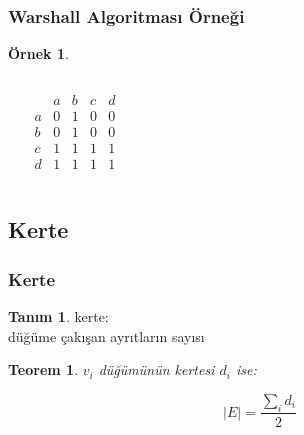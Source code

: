 \documentclass[dvipsnames]{beamer}
\theoremstyle{definition}
\newtheorem{tanim}[theorem]{Tanım}
\theoremstyle{example}
\newtheorem{ornek}[theorem]{Örnek}
\theoremstyle{plain}
\newtheorem{teorem}[theorem]{Teorem}
\begin{document}
\begin{frame}
  \frametitle{Warshall Algoritması Örneği}

  \begin{ornek}
    \begin{columns}
      \begin{center}
      \end{center}

      \[
        \begin{array}{c|cccc}
              & a & b & c & d\\\hline
            a & 0 & 1 & 0 & 0\\
            b & 0 & 1 & 0 & 0\\
            c & 1 & 1 & 1 & 1\\
            d & 1 & 1 & 1 & 1
        \end{array}
      \]
    \end{columns}
  \end{ornek}
\end{frame}

\subsection{Kerte}

\begin{frame}
  \frametitle{Kerte}

  \begin{tanim}
    \alert{kerte}:\\
    düğüme çakışan ayrıtların sayısı
  \end{tanim}

  \pause
  \begin{teorem}
    $v_i$ düğümünün kertesi $d_i$ ise:

    \[|E| = \frac{\sum_i d_i}{2}\]
  \end{teorem}
\end{frame}
\end{document}
